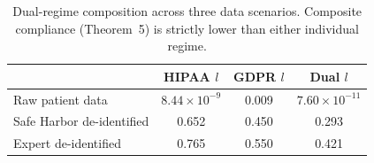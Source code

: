 
\begin{table}[t]
\centering
\caption{Dual-regime composition across three data scenarios. Composite compliance (Theorem~5) is strictly lower than either individual regime.}
\label{tab:dual_regime}
\footnotesize
\begin{tabular}{@{}lccc@{}}
\toprule
& HIPAA $l$ & GDPR $l$ & Dual $l$ \\
\midrule
Raw patient data & $8.44 \times 10^{-9}$ & 0.009 & $7.60 \times 10^{-11}$ \\
Safe Harbor de-identified & 0.652 & 0.450 & 0.293 \\
Expert de-identified & 0.765 & 0.550 & 0.421 \\
\bottomrule
\end{tabular}
\end{table}
